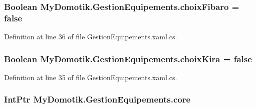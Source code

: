 \subsubsection[{\texorpdfstring{choix\+Fibaro}{choixFibaro}}]{\setlength{\rightskip}{0pt plus 5cm}Boolean My\+Domotik.\+Gestion\+Equipements.\+choix\+Fibaro = false\hspace{0.3cm}{\ttfamily [private]}}\hypertarget{class_my_domotik_1_1_gestion_equipements_a931bcae29b85b50fe0805a1afccadda4}{}\label{class_my_domotik_1_1_gestion_equipements_a931bcae29b85b50fe0805a1afccadda4}


Definition at line 36 of file Gestion\+Equipements.\+xaml.\+cs.

\subsubsection[{\texorpdfstring{choix\+Kira}{choixKira}}]{\setlength{\rightskip}{0pt plus 5cm}Boolean My\+Domotik.\+Gestion\+Equipements.\+choix\+Kira = false\hspace{0.3cm}{\ttfamily [private]}}\hypertarget{class_my_domotik_1_1_gestion_equipements_a8cfb37128fab5e3d9a6ec086c5f15b19}{}\label{class_my_domotik_1_1_gestion_equipements_a8cfb37128fab5e3d9a6ec086c5f15b19}


Definition at line 35 of file Gestion\+Equipements.\+xaml.\+cs.

\subsubsection[{\texorpdfstring{core}{core}}]{\setlength{\rightskip}{0pt plus 5cm}Int\+Ptr My\+Domotik.\+Gestion\+Equipements.\+core\hspace{0.3cm}{\ttfamily [private]}}\hypertarget{class_my_domotik_1_1_gestion_equipements_a82c5ff73bf002b9bc1a92e5d380cb252}{}\label{class_my_domotik_1_1_gestion_equipements_a82c5ff73bf002b9bc1a92e5d380cb252}


